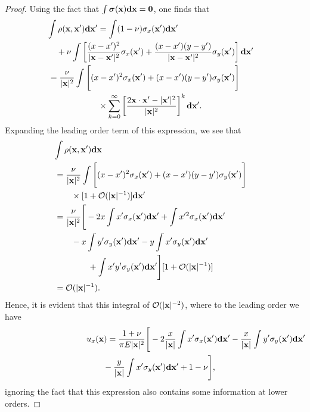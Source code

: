 \documentclass[aps,prl,reprint,twocolumn,groupedaddress,showpacs]{revtex4-1}
\newcommand{\bsigma}{{\boldsymbol\sigma}}
\def\d{{\bf d}}
\def\x{{\bf x}}
\begin{document}
\begin{proof}
Using the fact that $\int \bsigma(\x)\d\x = \mathbf{0}$, one finds that
%
\begin{align}
\lefteqn{\int \rho(\x,\x')\d\x'  =  \int (1-\nu)\sigma_x(\x')\d\x'}\nonumber\\
&\quad+\nu\int\left[ \frac{(x - x')^2}{|\x-\x'|^2} \sigma_{x}(\x') +  \frac{(x-x')(y-y')}{|\x-\x'|^2} \sigma_y(\x')  \right]\d\x' \nonumber\\
&= \frac{\nu}{|\x|^2}\int\Bigg[  (x - x')^2\sigma_{x}(\x')  + (x-x')(y-y')\sigma_y(\x')  \Bigg] \nonumber\\
&\qquad\qquad\qquad\times\sum_{k=0}^\infty \left[  \frac{2\x\cdot\x' - |\x'|^2}{|\x|^2} \right]^k \d\x'.
\end{align}
Expanding the leading order term of this expression, we see that
\begin{align*}
\lefteqn{\int\rho(\x,\x')\d\x } \nonumber\\
&= \frac{\nu}{|\x|^2}\int\Bigg[  (x - x')^2\sigma_{x}(\x')  + (x-x')(y-y')\sigma_y(\x')  \Bigg] \nonumber\\
&\qquad\times[1+\mathcal{O}(|\x|^{-1}) ]\d\x' \nonumber\\
&= \frac{\nu}{|\x|^2}  \Bigg[  -2x\int x'\sigma_x(\x')\d\x'  + \int x'^2\sigma_x(\x')\d\x'  \nonumber\\
&\qquad  - x\int y' \sigma_y(\x') \d\x'- y\int x'\sigma_y(\x')\d\x' \nonumber\\
&\qquad\qquad + \int x'y' \sigma_y(\x') \d\x'\Bigg][1+\mathcal{O}(|\x|^{-1}) ]\nonumber\\
&=\mathcal{O}(|\x|^{-1}).
\end{align*}
Hence, it is evident that this integral of $\mathcal{O}(|\x|^{-2})$, where to the leading order we have
\begin{align}
\lefteqn{u_x(\x) = \frac{1+\nu}{\pi E |\x|^2}\Bigg[ -2\frac{x}{|\x|}\int x'\sigma_x(\x')\d\x' - \frac{x}{|\x|}\int y' \sigma_y(\x') \d\x'  }\nonumber\\
&\qquad- \frac{y}{|\x|}\int x'\sigma_y(\x')\d\x' + 1-\nu \Bigg],
\end{align}
ignoring the fact that this expression also contains some information at lower orders.


\end{proof}
\end{document}
